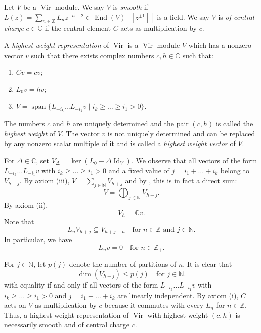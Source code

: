 \documentclass[a4paper, 12pt, reqno]{amsart}
\theoremstyle{remark}
\numberwithin{equation}{subsection}
\DeclareMathOperator{\Vir}{Vir}
\DeclareMathOperator{\Id}{Id}
\DeclareMathOperator{\End}{End}
\DeclareMathOperator{\vspan}{span}
\begin{document}
Let $V$ be a $\Vir$-module.
We say $V$ is \emph{smooth} if $L(z) = \sum_{n \in \mathbb{Z}}L_{n}z^{-n - 2} \in \End(V)[[z^{\pm 1}]]$ is a field.
We say $V$ is \emph{of central charge} $c \in \mathbb{C}$ if the central element $C$ acts as multiplication by $c$.

A \emph{highest weight representation} of $\Vir$ is a $\Vir$-module $V$ which has a nonzero vector $v$ such that there exists complex numbers $c, h \in \mathbb{C}$ such that:
\begin{enumerate}
  \item $Cv = cv$;
  \item $L_0v = hv$;
  \item $V = \vspan\{L_{-i_k}\dots L_{-i_1}v \mid i_k \ge \dots \ge i_1 > 0\}$.
\end{enumerate}
The numbers $c$ and $h$ are uniquely determined and the pair $(c, h)$ is called the \emph{highest weight} of $V$.
The vector $v$ is not uniquely determined and can be replaced by any nonzero scalar multiple of it and is called a \emph{highest weight vector} of $V$.

For $\Delta \in \mathbb{C}$, set $V_{\Delta} = \ker(L_0 - \Delta\Id_V)$.
We observe that all vectors of the form $L_{-i_k}\dots L_{-i_1}v$ with $i_k \ge \dots \ge i_1 > 0$ and a fixed value of $j = i_1 + \dots + i_k$ belong to $V_{h + j}$.
By axiom (iii), $V = \sum_{j \in \mathbb{N}}V_{h + j}$ and by , this is in fact a direct sum:
\begin{equation}
  \label{eq:23}
  V = \bigoplus_{j \in \mathbb{N}}V_{h + j}.
\end{equation}
By axiom (ii),
\begin{equation*}
  V_h = \mathbb{C}v.
\end{equation*}
Note that
\begin{equation*}
  L_nV_{h + j}\subseteq V_{h + j - n} \quad \text{for }n \in \mathbb{Z}\text{ and }j \in \mathbb{N}.
\end{equation*}
In particular, we have
\begin{equation}
  \label{eq:24}
  L_nv = 0 \quad \text{for }n \in \mathbb{Z}_+.
\end{equation}

For $j \in \mathbb{N}$, let $p(j)$ denote the number of partitions of $n$.
It is clear that
\begin{equation}
  \label{eq:25}
  \dim(V_{h + j}) \le p(j) \quad \text{for }j \in \mathbb{N}.
\end{equation}
with equality if and only if all vectors of the form $L_{-i_k}\dots L_{-i_1}v$ with $i_k \ge \dots \ge i_1 > 0$ and $j = i_1 + \dots + i_k$ are linearly independent.
By axiom (i), $C$ acts on $V$ as multiplication by $c$ because it commutes with every $L_n$ for $n \in \mathbb{Z}$.
Thus, a highest weight representation of $\Vir$ with highest weight $(c, h)$ is necessarily smooth and of central charge $c$.
\end{document}
